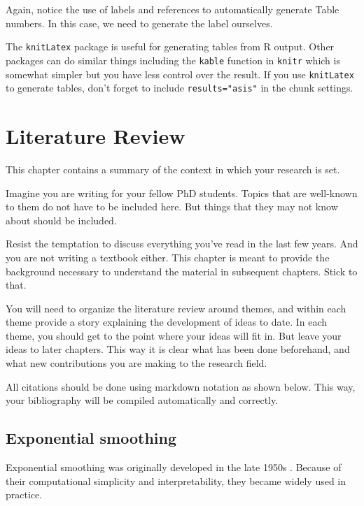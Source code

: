 \documentclass[doubleside,doublespace]{aucklandthesis}
\begin{document}
Again, notice the use of labels and references to automatically generate Table numbers. In this case, we need to generate the label ourselves.

The \texttt{knitLatex} package is useful for generating tables from R output. Other packages can do similar things including the \texttt{kable} function in \texttt{knitr} which is somewhat simpler but you have less control over the result. If you use \texttt{knitLatex} to generate tables, don't forget to include \texttt{results="asis"} in the chunk settings.

\hypertarget{ch:litreview}{%
\chapter{Literature Review}\label{ch:litreview}}

This chapter contains a summary of the context in which your research is set.

Imagine you are writing for your fellow PhD students. Topics that are well-known to them do not have to be included here. But things that they may not know about should be included.

Resist the temptation to discuss everything you've read in the last few years. And you are not writing a textbook either. This chapter is meant to provide the background necessary to understand the material in subsequent chapters. Stick to that.

You will need to organize the literature review around themes, and within each theme provide a story explaining the development of ideas to date. In each theme, you should get to the point where your ideas will fit in. But leave your ideas to later chapters. This way it is clear what has been done beforehand, and what new contributions you are making to the research field.

All citations should be done using markdown notation as shown below. This way, your bibliography will be compiled automatically and correctly.

\hypertarget{sec:expsmooth}{%
\section{Exponential smoothing}\label{sec:expsmooth}}

Exponential smoothing was originally developed in the late 1950s \autocite{Brown59,Brown63,Holt57,Winters60}. Because of their computational simplicity and interpretability, they became widely used in practice.
\end{document}
